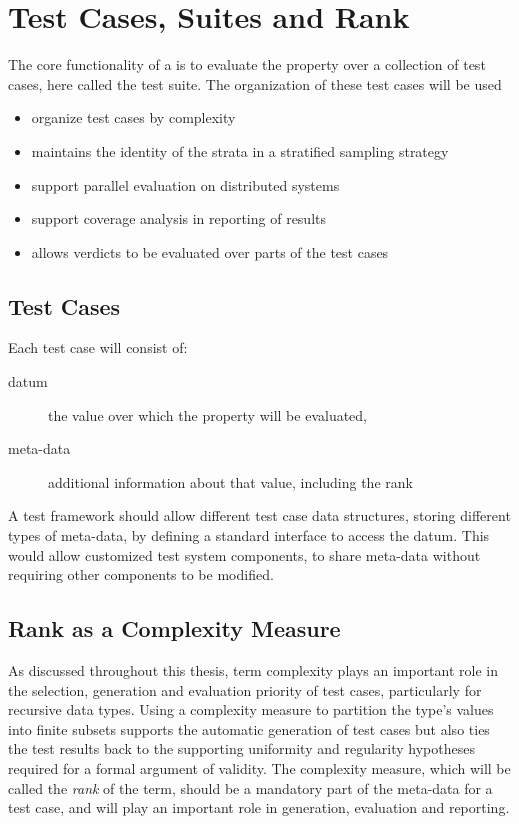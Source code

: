 \section{Test Cases, Suites and Rank} \label{reqtestsuite}

The core functionality of a \PBT is to evaluate the property over 
a collection of test cases, here called the test suite.
The organization of these test cases will be used 
\begin{itemize}
	\item organize test cases by complexity 
	\item maintains the identity of the strata in a stratified sampling strategy
	\item support parallel evaluation on distributed systems
	\item support coverage analysis in reporting of results
	\item allows verdicts to be evaluated over parts of the test cases
\end{itemize}

\subsection{Test Cases}

Each test case will consist of:

\begin{description}
	\item[datum] the value over which the property will be evaluated,
	\item[meta-data] additional information about that value, including the rank
\end{description} 
\noindent
A test framework should allow different test case data structures,
storing different types of meta-data,
by defining a standard interface to access the datum.
This would allow customized test system components,
to share meta-data without requiring other components to be modified.

\subsection{Rank as a Complexity Measure }\label{sub:reqrank}

As discussed throughout this thesis,
term complexity plays an important role
in the selection, generation and evaluation priority of test cases,
particularly for recursive data types.
Using a complexity measure to partition the type's values into finite subsets
supports the automatic generation of test cases
but also ties the test results back to the supporting uniformity and regularity hypotheses
required for a formal argument of validity.
The complexity measure, which will be called the \emph{rank} of the term,
should be a mandatory part of the meta-data for a test case,
and will play an important role in generation, evaluation and reporting.

